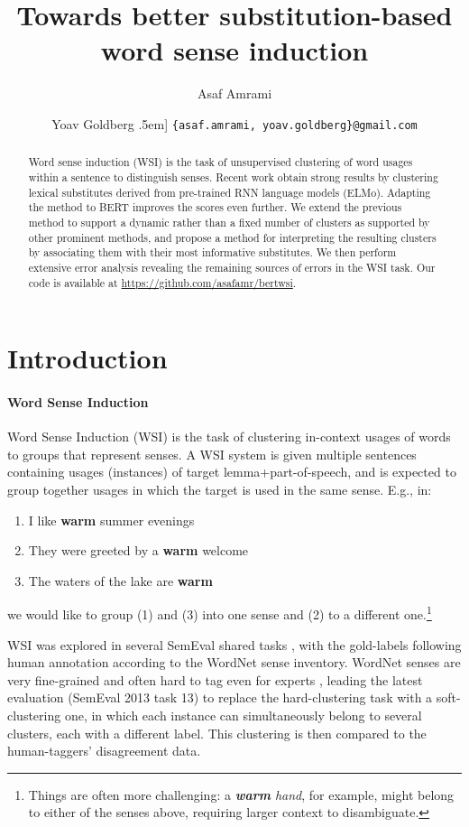 \documentclass[11pt,a4paper]{article}
\title{Towards better substitution-based word sense induction}
\author{Asaf Amrami \and Yoav Goldberg \0.5em]
  {\tt \{asaf.amrami, yoav.goldberg\}@gmail.com}
  }
\date{}
\begin{document}
\maketitle
\begin{abstract}
 Word sense induction (WSI) is the task of unsupervised clustering of word usages within a sentence to distinguish senses. Recent work obtain strong results by clustering lexical substitutes derived from pre-trained RNN language models (ELMo). Adapting the method to BERT improves the scores even further. We extend the previous method to support a dynamic rather than a fixed number of clusters as supported by other prominent methods, and propose a method for interpreting the resulting clusters by associating them with their most informative substitutes. We then perform extensive error analysis revealing the remaining sources of errors in the WSI task.
 Our code is available at \url{https://github.com/asafamr/bertwsi}.
\end{abstract}

\section{Introduction}

\paragraph{Word Sense Induction }

Word Sense Induction (WSI) is the task of clustering in-context usages of
words to groups that represent senses.
A WSI system is given multiple sentences containing usages (instances) of
target lemma+part-of-speech, and is expected to group together usages in which
the target is used in the same sense. E.g., in:


\begin{enumerate}[itemsep=-2mm]
\item I like \textbf{warm} summer evenings
\item They were greeted by a \textbf{warm} welcome
\item The waters of the lake are \textbf{warm}
\end{enumerate}
we would like to group (1) and (3) into one sense and (2) to a different
one.\footnote{Things are often more challenging: a \textit{\textbf{warm} hand},
for example, might belong to either of the senses above, requiring larger
context to disambiguate.}

WSI was explored in several SemEval shared tasks
\cite{semeval2007wsi,semeval2010wsi,semeval2013wsi}, with the gold-labels
following human annotation according to the WordNet \cite{wordnet} sense inventory.
WordNet senses are very fine-grained and often hard to tag even for experts \citep{snyder2004english}, leading the latest evaluation (SemEval 2013 task 13) to replace
the hard-clustering task with a soft-clustering one, in which each instance can simultaneously belong to several clusters, each with a different label. This clustering is then compared to
the human-taggers' disagreement data.
\end{document}
